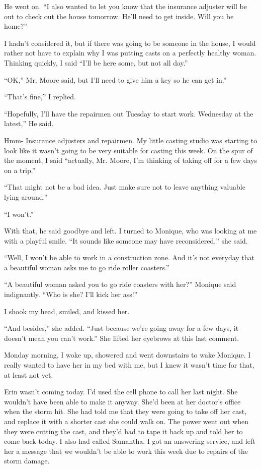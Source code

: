 He went on. ``I also wanted to let you know that the insurance adjuster will be out to check
out the house tomorrow. He'll need to get inside. Will you be home?''

I hadn't considered it, but if there was going to be someone in the house, I would rather
not have to explain why I was putting casts on a perfectly healthy woman. Thinking quickly, I
said ``I'll be here some, but not all day.''

``OK,'' Mr. Moore said, but I'll need to give him a key so he can get in.''

``That's fine,'' I replied.

``Hopefully, I'll have the repairmen out Tuesday to start work. Wednesday at the latest,'' He
said.

Hmm- Insurance adjusters and repairmen. My little casting studio was starting to look like
it wasn't going to be very suitable for casting this week. On the spur of the moment, I said
``actually, Mr. Moore, I'm thinking of taking off for a few days on a trip.''

``That might not be a bad idea. Just make sure not to leave anything valuable lying around.''

``I won't.''

With that, he said goodbye and left. I turned to Monique, who was looking at me with a
playful smile. ``It sounds like someone may have reconsidered,'' she said.

``Well, I won't be able to work in a construction zone. And it's not everyday that a
beautiful woman asks me to go ride roller coasters.''

``A beautiful woman asked you to go ride coasters with her?'' Monique said indignantly. ``Who
is she? I'll kick her ass!''

I shook my head, smiled, and kissed her.

``And besides,'' she added. ``Just because we're going away for a few days, it doesn't mean you
can't work.'' She lifted her eyebrows at this last comment.

Monday morning, I woke up, showered and went downstairs to wake Monique. I really wanted to
have her in my bed with me, but I knew it wasn't time for that, at least not yet.

Erin wasn't coming today. I'd used the cell phone to call her last night. She wouldn't have
been able to make it anyway. She'd been at her doctor's office when the storm hit. She had told
me that they were going to take off her cast, and replace it with a shorter cast she could walk
on. The power went out when they were cutting the cast, and they'd had to tape it back up and
told her to come back today. I also had called Samantha. I got an answering service, and left
her a message that we wouldn't be able to work this week due to repairs of the storm damage.

